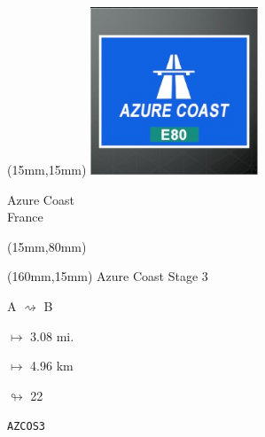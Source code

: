\begin{textblock*}{50mm}(15mm,15mm)%
\includegraphics[width=50mm]{LG/2015-05-20_00073.png}
\par Azure Coast\\ France
\end{textblock*}
\begin{textblock*}{185mm}(15mm,80mm)%
\end{textblock*}
\begin{textblock*}{40mm}(160mm,15mm)%
Azure Coast Stage 3
\par A $\rightsquigarrow$ B
\Large
\par$\mapsto$ 3.08 mi.
\par$\mapsto$ 4.96 km
\par$\looparrowright$ 22
\par\hfill\tiny\tt AZCOS3\\
\end{textblock*}
\null\newpage

